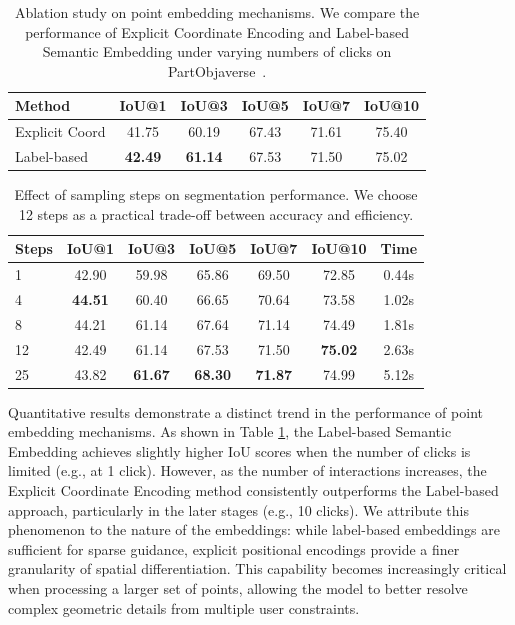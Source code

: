 \begin{table}[t]
\small
  \centering
  \caption{Ablation study on point embedding mechanisms. We compare the performance of Explicit Coordinate Encoding and Label-based Semantic Embedding under varying numbers of clicks on PartObjaverse~\cite{partobjaverse_tiny}.}
  \label{tab:ablation_embedding}
  \setlength{\tabcolsep}{3.5pt}
  \begin{tabular}{l|ccccc}
    \toprule
    Method & IoU@1 & IoU@3 & IoU@5 & IoU@7 & IoU@10 \\
    \midrule
    Explicit Coord & 41.75 & 60.19 & 67.43 & 71.61 & 75.40 \\
    Label-based    & \textbf{42.49} & \textbf{61.14} & 67.53 & 71.50 & 75.02 \\
    \bottomrule
  \end{tabular}
\end{table}

\begin{table}[t]
\small
    \centering
    \caption{Effect of sampling steps on segmentation performance. We choose 12 steps as a practical trade-off between accuracy and efficiency.}
    \label{tab:steps_analysis}
    \setlength{\tabcolsep}{4pt}
    \begin{tabular}{l|cccccc}
    \toprule
    Steps & IoU@1 & IoU@3 & IoU@5 & IoU@7 & IoU@10 & Time \\
    \midrule
    1 & 42.90 & 59.98 & 65.86 & 69.50 & 72.85 & 0.44s \\
    4 & \textbf{44.51} & 60.40 & 66.65 & 70.64 & 73.58 & 1.02s \\
    8 & 44.21 & 61.14 & 67.64 & 71.14 & 74.49 & 1.81s \\
    12 & 42.49 & 61.14 & 67.53 & 71.50 & \textbf{75.02} & 2.63s \\
    25 & 43.82 & \textbf{61.67} & \textbf{68.30} & \textbf{71.87} & 74.99 & 5.12s \\
    \bottomrule
    \end{tabular}
\end{table}

Quantitative results demonstrate a distinct trend in the performance of point embedding mechanisms. As shown in Table \ref{tab:ablation_embedding}, the Label-based Semantic Embedding achieves slightly higher IoU scores when the number of clicks is limited (e.g., at 1 click). However, as the number of interactions increases, the Explicit Coordinate Encoding method consistently outperforms the Label-based approach, particularly in the later stages (e.g., 10 clicks).
We attribute this phenomenon to the nature of the embeddings: while label-based embeddings are sufficient for sparse guidance, explicit positional encodings provide a finer granularity of spatial differentiation. This capability becomes increasingly critical when processing a larger set of points, allowing the model to better resolve complex geometric details from multiple user constraints.


